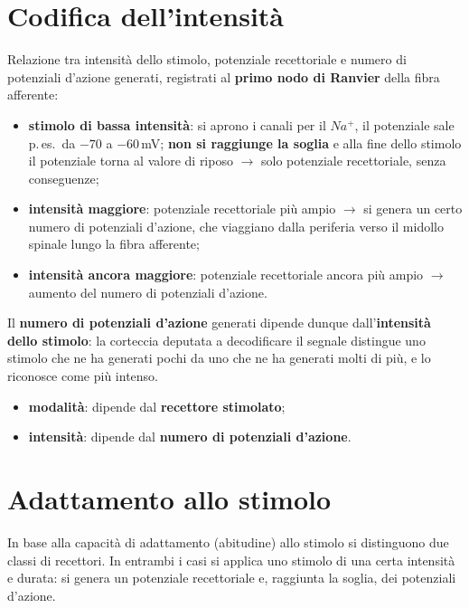 \section{Codifica dell'intensità}

Relazione tra intensità dello stimolo, potenziale recettoriale e numero di potenziali d'azione
generati, registrati al \textbf{primo nodo di Ranvier} della fibra afferente:

\begin{itemize}
  \item \textbf{stimolo di bassa intensità}: si aprono i canali per il $Na^+$, il potenziale sale
    p.\,es.\ da $-70$ a $-60$\,mV; \textbf{non si raggiunge la soglia} e alla fine dello stimolo il
    potenziale torna al valore di riposo $\rightarrow$ solo potenziale recettoriale, senza
    conseguenze;
  \item \textbf{intensità maggiore}: potenziale recettoriale più ampio $\rightarrow$ si genera un
    certo numero di potenziali d'azione, che viaggiano dalla periferia verso il midollo spinale
    lungo la fibra afferente;
  \item \textbf{intensità ancora maggiore}: potenziale recettoriale ancora più ampio $\rightarrow$
    aumento del numero di potenziali d'azione.
\end{itemize}

Il \textbf{numero di potenziali d'azione} generati dipende dunque dall'\textbf{intensità dello
stimolo}: la corteccia deputata a decodificare il segnale distingue uno stimolo che ne ha generati
pochi da uno che ne ha generati molti di più, e lo riconosce come più intenso.

\begin{itemize}
  \item \textbf{modalità}: dipende dal \textbf{recettore stimolato};
  \item \textbf{intensità}: dipende dal \textbf{numero di potenziali d'azione}.
\end{itemize}

\section{Adattamento allo stimolo}

In base alla capacità di adattamento (abitudine) allo stimolo si distinguono due classi di
recettori. In entrambi i casi si applica uno stimolo di una certa intensità e durata: si genera un
potenziale recettoriale e, raggiunta la soglia, dei potenziali d'azione.

